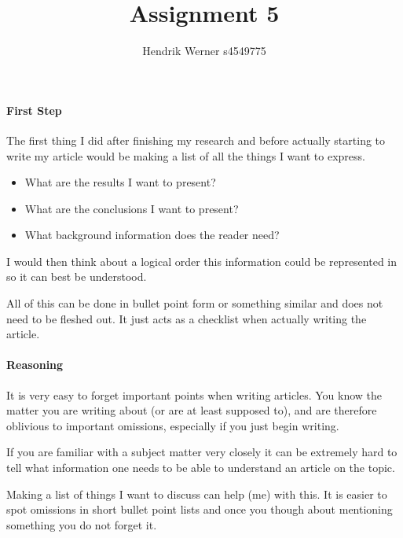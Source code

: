 \documentclass[12pt, a4paper]{article}
\title{\vspace{-1em}Assignment 5}
\author{Hendrik Werner s4549775}
\begin{document}
\maketitle

\paragraph{First Step}
The first thing I did after finishing my research and before actually starting to write my article would be making a list of all the things I want to express.

\begin{itemize}
	\item What are the results I want to present?
	\item What are the conclusions I want to present?
	\item What background information does the reader need?
\end{itemize}

I would then think about a logical order this information could be represented in so it can best be understood.

All of this can be done in bullet point form or something similar and does not need to be fleshed out. It just acts as a checklist when actually writing the article.

\paragraph{Reasoning}
It is very easy to forget important points when writing articles. You know the matter you are writing about (or are at least supposed to), and are therefore oblivious to important omissions, especially if you just begin writing.

If you are familiar with a subject matter very closely it can be extremely hard to tell what information one needs to be able to understand an article on the topic.

Making a list of things I want to discuss can help (me) with this. It is easier to spot omissions in short bullet point lists and once you though about mentioning something you do not forget it.
\end{document}

